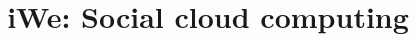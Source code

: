 \documentclass[]{h2020proposal}     %
\title{iWe: Social cloud computing}
\newcommand{\onlyinsubfile}[1]{#1}
\newcommand{\notinsubfile}[1]{}
\begin{document}
\renewcommand{\onlyinsubfile}[1]{}
\renewcommand{\notinsubfile}[1]{#1}

\maketitle
\vspace{1em}





%
%
%
\end{document}

